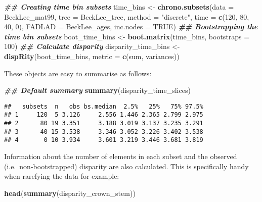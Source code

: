 \documentclass[
]{book}
\newenvironment{Shaded}{\begin{snugshade}}{\end{snugshade}}
\newcommand{\AttributeTok}[1]{\textcolor[rgb]{0.13,0.29,0.53}{#1}}
\newcommand{\ConstantTok}[1]{\textcolor[rgb]{0.56,0.35,0.01}{#1}}
\newcommand{\DecValTok}[1]{\textcolor[rgb]{0.00,0.00,0.81}{#1}}
\newcommand{\DocumentationTok}[1]{\textcolor[rgb]{0.56,0.35,0.01}{\textbf{\textit{#1}}}}
\newcommand{\FunctionTok}[1]{\textcolor[rgb]{0.13,0.29,0.53}{\textbf{#1}}}
\newcommand{\NormalTok}[1]{#1}
\newcommand{\OtherTok}[1]{\textcolor[rgb]{0.56,0.35,0.01}{#1}}
\newcommand{\StringTok}[1]{\textcolor[rgb]{0.31,0.60,0.02}{#1}}
\begin{document}
\begin{Shaded}
\begin{Highlighting}[]
\DocumentationTok{\#\# Creating time bin subsets}
\NormalTok{time\_bins }\OtherTok{\textless{}{-}} \FunctionTok{chrono.subsets}\NormalTok{(}\AttributeTok{data =}\NormalTok{ BeckLee\_mat99,}
                            \AttributeTok{tree =}\NormalTok{ BeckLee\_tree, }
                            \AttributeTok{method =} \StringTok{"discrete"}\NormalTok{,}
                            \AttributeTok{time =} \FunctionTok{c}\NormalTok{(}\DecValTok{120}\NormalTok{, }\DecValTok{80}\NormalTok{, }\DecValTok{40}\NormalTok{, }\DecValTok{0}\NormalTok{),}
                            \AttributeTok{FADLAD =}\NormalTok{ BeckLee\_ages,}
                            \AttributeTok{inc.nodes =} \ConstantTok{TRUE}\NormalTok{)}
\DocumentationTok{\#\# Bootstrapping the time bin subsets}
\NormalTok{boot\_time\_bins }\OtherTok{\textless{}{-}} \FunctionTok{boot.matrix}\NormalTok{(time\_bins, }\AttributeTok{bootstraps =} \DecValTok{100}\NormalTok{)}
\DocumentationTok{\#\# Calculate disparity}
\NormalTok{disparity\_time\_bins }\OtherTok{\textless{}{-}} \FunctionTok{dispRity}\NormalTok{(boot\_time\_bins,}
                                \AttributeTok{metric =} \FunctionTok{c}\NormalTok{(sum, variances))}
\end{Highlighting}
\end{Shaded}

These objects are easy to summarise as follows:

\begin{Shaded}
\begin{Highlighting}[]
\DocumentationTok{\#\# Default summary}
\FunctionTok{summary}\NormalTok{(disparity\_time\_slices)}
\end{Highlighting}
\end{Shaded}

\begin{verbatim}
##   subsets  n   obs bs.median  2.5%   25%   75% 97.5%
## 1     120  5 3.126     2.556 1.446 2.365 2.799 2.975
## 2      80 19 3.351     3.188 3.019 3.137 3.235 3.291
## 3      40 15 3.538     3.346 3.052 3.226 3.402 3.538
## 4       0 10 3.934     3.601 3.219 3.446 3.681 3.819
\end{verbatim}

Information about the number of elements in each subset and the observed (i.e.~non-bootstrapped) disparity are also calculated.
This is specifically handy when rarefying the data for example:

\begin{Shaded}
\begin{Highlighting}[]
\FunctionTok{head}\NormalTok{(}\FunctionTok{summary}\NormalTok{(disparity\_crown\_stem))}
\end{Highlighting}
\end{Shaded}
\end{document}
